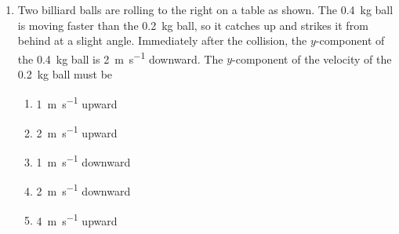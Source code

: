 \documentclass{../../oss-apphys}
\begin{document}
\begin{multicols}{2}
\begin{enumerate}[leftmargin=18pt]
  \item Two billiard balls are rolling to the right on a table as shown. The
    \SI{.4}{\kilo\gram} ball is moving faster than the \SI{.2}{\kilo\gram}
    ball, so it catches up and strikes it from behind at a slight angle.
    Immediately after the collision, the $y$-component of the
    \SI{.4}{\kilo\gram} ball is \SI{2}{\metre\per\second} downward.
    The $y$-component of the velocity of the \SI{.2}{\kilo\gram} ball must be
    \begin{center}
    \end{center}
    \begin{enumerate}[noitemsep,topsep=0pt,leftmargin=18pt,label=(\Alph*)]
    \item \SI{1}{\metre\per\second} upward
    \item \SI{2}{\metre\per\second} upward
    \item \SI{1}{\metre\per\second} downward
    \item \SI{2}{\metre\per\second} downward
    \item \SI{4}{\metre\per\second} upward
    \end{enumerate}
    


\end{enumerate}
\end{multicols}
\end{document}

